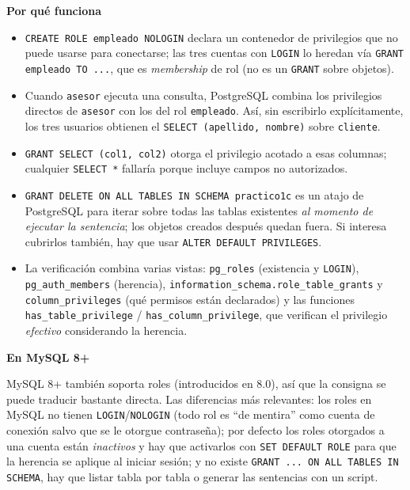 \documentclass[11pt,a4paper]{article}
\newcommand{\itemcabecera}[1]{\noindent\textbf{#1}\par\medskip}
\newcommand{\bloquePorque}{\itemcabecera{Por qu\'e funciona}}
\newcommand{\bloqueMySQL}{\itemcabecera{En MySQL 8+}}
\begin{document}
\bloquePorque

\begin{itemize}
    \item \texttt{CREATE ROLE empleado NOLOGIN} declara un contenedor de privilegios que no puede usarse para conectarse; las tres cuentas con \texttt{LOGIN} lo heredan vía \texttt{GRANT empleado TO ...}, que es \emph{membership} de rol (no es un \texttt{GRANT} sobre objetos).
    \item Cuando \texttt{asesor} ejecuta una consulta, PostgreSQL combina los privilegios directos de \texttt{asesor} con los del rol \texttt{empleado}. Así, sin escribirlo explícitamente, los tres usuarios obtienen el \texttt{SELECT (apellido, nombre)} sobre \texttt{cliente}.
    \item \texttt{GRANT SELECT (col1, col2)} otorga el privilegio acotado a esas columnas; cualquier \texttt{SELECT *} fallaría porque incluye campos no autorizados.
    \item \texttt{GRANT DELETE ON ALL TABLES IN SCHEMA practico1c} es un atajo de PostgreSQL para iterar sobre todas las tablas existentes \emph{al momento de ejecutar la sentencia}; los objetos creados después quedan fuera. Si interesa cubrirlos también, hay que usar \texttt{ALTER DEFAULT PRIVILEGES}.
    \item La verificación combina varias vistas: \texttt{pg\_roles} (existencia y \texttt{LOGIN}), \texttt{pg\_auth\_members} (herencia), \texttt{information\_schema.role\_table\_grants} y \texttt{column\_privileges} (qué permisos están declarados) y las funciones \texttt{has\_table\_privilege} / \texttt{has\_column\_privilege}, que verifican el privilegio \emph{efectivo} considerando la herencia.
\end{itemize}

\bloqueMySQL

MySQL 8+ también soporta roles (introducidos en 8.0), así que la consigna se puede traducir bastante directa. Las diferencias más relevantes: los roles en MySQL no tienen \texttt{LOGIN}/\texttt{NOLOGIN} (todo rol es ``de mentira'' como cuenta de conexión salvo que se le otorgue contraseña); por defecto los roles otorgados a una cuenta están \emph{inactivos} y hay que activarlos con \texttt{SET DEFAULT ROLE} para que la herencia se aplique al iniciar sesión; y no existe \texttt{GRANT ... ON ALL TABLES IN SCHEMA}, hay que listar tabla por tabla o generar las sentencias con un script.
\end{document}
